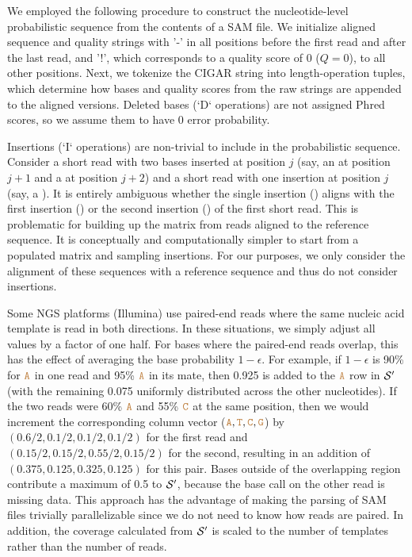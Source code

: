 \documentclass[10pt]{article}
\begin{document}
We employed the following procedure to construct the nucleotide-level probabilistic sequence from the contents of a SAM file.
We initialize aligned sequence and quality strings with '-' in all positions before the first read and after the last read, and '!', which corresponds to a quality score of 0 ($Q=0$), to all other positions.
Next, we tokenize the CIGAR string into length-operation tuples, which determine how bases and quality scores from the raw strings are appended to the aligned versions.
Deleted bases (`D` operations) are not assigned Phred scores, so we assume them to have 0 error probability.

Insertions (`I` operations) are non-trivial to include in the probabilistic sequence.
Consider a short read with two bases inserted at position $j$ (say, an  at position $j+1$ and a  at position $j+2$) and a short read with one insertion at position $j$ (say, a ).
It is entirely ambiguous whether the single insertion () aligns with the first insertion () or the second insertion () of the first short read. 
This is problematic for building up the matrix from reads aligned to the reference sequence.
It is conceptually and computationally simpler to start from a populated matrix and sampling insertions.
For our purposes, we only consider the alignment of these sequences with a reference sequence and thus do not consider insertions.

Some NGS platforms (\eg Illumina) use paired-end reads where the same nucleic acid template is read in both directions.
In these situations, we simply adjust all values by a factor of one half.
For bases where the paired-end reads overlap, this has the effect of averaging the base probability $1-\epsilon$.
For example, if $1-\epsilon$ is 90\% for $\texttt{\textcolor{brown}{A}}$ in one read and 95\% $\texttt{\textcolor{brown}{A}}$ in its mate, then 0.925 is added to the $\texttt{\textcolor{brown}{A}}$ row in $\mathcal{S}'$ (with the remaining 0.075 uniformly distributed across the other nucleotides).
If the two reads were 60\% $\texttt{\textcolor{brown}{A}}$ and 55\% $\texttt{\textcolor{brown}{C}}$ at the same position, then we would increment the corresponding column vector ($\texttt{\textcolor{brown}{A}}, \texttt{\textcolor{brown}{T}}, \texttt{\textcolor{brown}{C}}, \texttt{\textcolor{brown}{G}}$) by $(0.6/2, 0.1/2, 0.1/2, 0.1/2)$ for the first read and $(0.15/2, 0.15/2, 0.55/2, 0.15/2)$ for the second, resulting in an addition of $(0.375, 0.125, 0.325, 0.125)$ for this pair.
Bases outside of the overlapping region contribute a maximum of 0.5 to $\mathcal{S}'$, because the base call on the other read is missing data.
This approach has the advantage of making the parsing of SAM files trivially parallelizable since we do not need to know how reads are paired.
In addition, the coverage calculated from $\mathcal{S}'$ is scaled to the number of templates rather than the number of reads.
\end{document}
